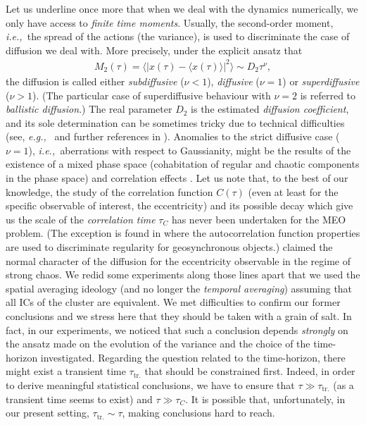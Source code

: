 \documentclass{amsart}
\theoremstyle{definition}
\theoremstyle{remark}
\numberwithin{equation}{section}
\newcommand{\ie}{\textit{i.e.,\ }}
\newcommand{\eg}{\textit{e.g.,\ }}
\begin{document}
Let us underline once more that when we deal with the dynamics numerically, we only have access to \textit{finite time moments}. Usually, the second-order moment, \ie the spread of the actions (the variance), is used to discriminate the case of diffusion we deal with. 
More precisely, under the explicit ansatz that
\begin{align}
	M_{2}(\tau) = \big\langle \vert x(\tau) - \langle x(\tau) \rangle \vert^{2} \big \rangle \sim D_{2} \tau^{\nu},
\end{align}
the diffusion is called either \textit{subdiffusive} ($\nu < 1$), \textit{diffusive} ($\nu = 1$) or \textit{superdiffusive} ($\nu > 1$). (The particular case of superdiffusive behaviour with $\nu=2$ is referred to \textit{ballistic diffusion}.) The real parameter $D_{2}$ is the estimated \textit{diffusion coefficient}, and its sole  determination can be sometimes tricky due to technical difficulties (see, \eg \citet{eLe03} and further references in \citet{pCi18}). Anomalies to the strict diffusive case ($\nu=1$), \ie aberrations with respect to Gaussianity, might be the results of the existence of a mixed phase space (cohabitation of regular and chaotic components in the phase space) and correlation effects \citep{hVa97,gZa02}. Let us note that, to the best of our knowledge, the study of the correlation function $C(\tau)$ (even at least for the  specific observable of interest, the eccentricity) and its possible decay which give us the scale of the \textit{correlation time} $\tau_{C}$ \citep[see discussions in][]{sWi04,hVa05} has never been undertaken for the MEO problem. {\color{black}(The exception is found in \cite{iWy07}  where the autocorrelation function properties are used to discriminate regularity for geosynchronous objects.)}
\cite{jDa17} claimed the normal character of the diffusion for the eccentricity observable in the regime of strong chaos. We redid 
some experiments along those lines apart that we used the spatial averaging ideology (and no longer the \textit{temporal averaging}) assuming that all ICs of the cluster are equivalent. We met difficulties to confirm our former conclusions and we stress here that they should be taken with a grain of salt.  
In fact, in our experiments, we noticed that such a conclusion depends \textit{strongly} on the ansatz made on the evolution of the variance and  the choice of the time-horizon investigated. Regarding the question related to the time-horizon, there might exist a transient time $\tau_{\textrm{tr.}}$ that should be constrained first. Indeed, in order to derive meaningful statistical conclusions, we have to ensure that $\tau \gg \tau_{\textrm{tr.}}$ (as a transient time seems to exist) and
$\tau \gg \tau_{C}$. It is possible that, unfortunately, in our present setting, $\tau_{\textrm{tr.}} \sim \tau$, making conclusions hard to reach. 
\end{document}
